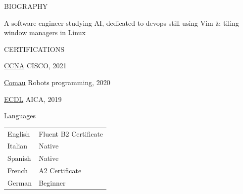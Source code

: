\documentclass{cv} %
\begin{document}





\begin{minipage}[l]{0.3\linewidth}

\begin{minipage}[c]{\linewidth}
    \centering
\end{minipage}

\begin{rSection}{BIOGRAPHY}
    \item A software engineer studying AI,
    dedicated to devops
    still using Vim \& tiling window managers in Linux
\end{rSection}

\begin{rSection}{CERTIFICATIONS}
    \item \underline{CCNA} {CISCO, 2021}
    \item \underline{Comau} {Robots programming, 2020}
    \item \underline{ECDL} {AICA, 2019}
\end{rSection}

\begin{rSection}{Languages}
    \item \begin{tabular}{ll}
        English & Fluent B2 Certificate     \\
        Italian & Native                    \\
        Spanish & Native                    \\
        French  & A2 Certificate            \\
        German  & Beginner                  \\
    \end{tabular}
\end{rSection}
\end{minipage}
\end{document}
